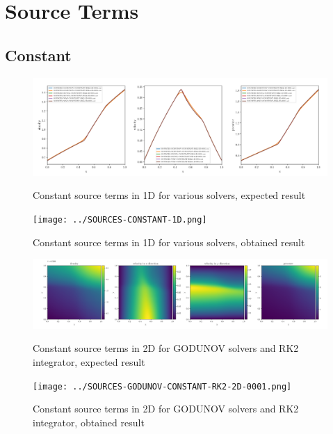 \clearpage
\section{Source Terms}

\subsection{Constant}




    \begin{figure}[htbp]
        \centering
        \includegraphics[width=.9\textwidth]{./figures/SOURCES-CONSTANT-1D.png}%
        \caption{Constant source terms in 1D for various solvers, expected result}
        \texttt{[image: ../SOURCES-CONSTANT-1D.png]}%
        \caption{Constant source terms in 1D for various solvers, obtained result}
    \end{figure}



    \begin{figure}[htbp]
        \centering
        \includegraphics[width=.9\textwidth]{./figures/SOURCES-GODUNOV-CONSTANT-RK2-2D-0001.png}%
        \caption{Constant source terms in 2D for GODUNOV solvers and RK2 integrator, expected result}
        \texttt{[image: ../SOURCES-GODUNOV-CONSTANT-RK2-2D-0001.png]}%
        \caption{Constant source terms in 2D for GODUNOV solvers and RK2 integrator, obtained result}
    \end{figure}

